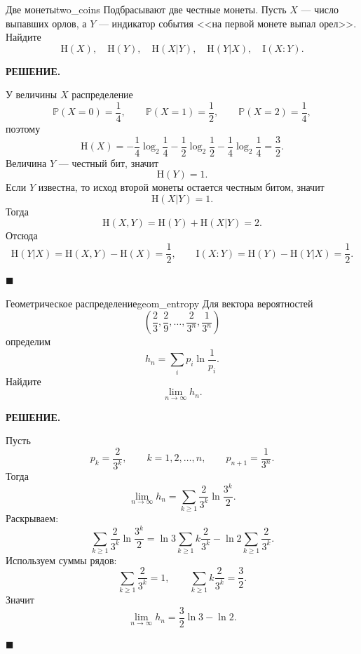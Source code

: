 \documentclass[12pt,a4paper]{article}
\renewcommand{\ge}{\geqslant}
\newcommand{\HH}{\mathrm{H}}
\newcommand{\II}{\mathrm{I}}
\newcommand{\PP}{\mathbb{P}}
\newenvironment{solution}{
    \begin{tcolorbox}[
        enhanced, breakable, blanker,
        borderline west={2.5pt}{0pt}{solgray},
        left=12pt, top=5pt, bottom=5pt,
        before skip=10pt, after skip=15pt
    ]
    \textbf{\textsf{РЕШЕНИЕ.}}\;
}{
    \hfill $\blacksquare$
    \end{tcolorbox}
}
\begin{document}
\begin{problem}{Две монеты}{two_coins}
Подбрасывают две честные монеты. Пусть $X$ --- число выпавших орлов, а $Y$ --- индикатор события <<на первой монете выпал орел>>. Найдите
$$
\HH(X),\quad \HH(Y),\quad \HH(X|Y),\quad \HH(Y|X),\quad \II(X:Y).
$$
\end{problem}
\begin{solution}
У величины $X$ распределение
$$
\PP(X=0)=\frac14,\qquad \PP(X=1)=\frac12,\qquad \PP(X=2)=\frac14,
$$
поэтому
$$
\HH(X)= -\frac14\log_2\frac14-\frac12\log_2\frac12-\frac14\log_2\frac14=\frac32.
$$
Величина $Y$ --- честный бит, значит
$$
\HH(Y)=1.
$$
Если $Y$ известна, то исход второй монеты остается честным битом, значит
$$
\HH(X|Y)=1.
$$
Тогда
$$
\HH(X,Y)=\HH(Y)+\HH(X|Y)=2.
$$
Отсюда
$$
\HH(Y|X)=\HH(X,Y)-\HH(X)=\frac12,
\qquad
\II(X:Y)=\HH(Y)-\HH(Y|X)=\frac12.
$$
\end{solution}

\begin{problem}{Геометрическое распределение}{geom_entropy}
Для вектора вероятностей
$$
\left(\frac23,\frac29,\dots,\frac{2}{3^n},\frac{1}{3^n}\right)
$$
определим
$$
h_n=\sum_i p_i \ln \frac{1}{p_i}.
$$
Найдите
$$
\lim_{n\to\infty} h_n.
$$
\end{problem}
\begin{solution}
Пусть
$$
p_k=\frac{2}{3^k},\qquad k=1,2,\dots,n,
\qquad
p_{n+1}=\frac{1}{3^n}.
$$
Тогда
$$
\lim_{n\to\infty} h_n
=\sum_{k\ge 1}\frac{2}{3^k}\ln\frac{3^k}{2}.
$$
Раскрываем:
$$
\sum_{k\ge 1}\frac{2}{3^k}\ln\frac{3^k}{2}
=
\ln 3\sum_{k\ge 1}k\frac{2}{3^k}
-\ln 2\sum_{k\ge 1}\frac{2}{3^k}.
$$
Используем суммы рядов:
$$
\sum_{k\ge 1}\frac{2}{3^k}=1,
\qquad
\sum_{k\ge 1}k\frac{2}{3^k}=\frac32.
$$
Значит
$$
\lim_{n\to\infty} h_n=\frac32\ln 3-\ln 2.
$$
\end{solution}
\end{document}
